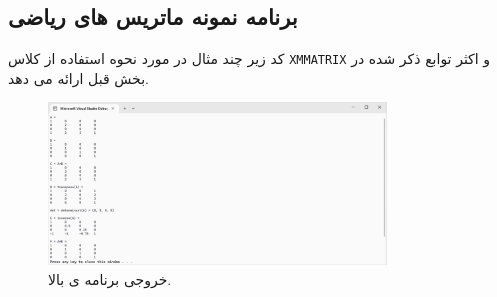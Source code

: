 \subsection{\textbf{برنامه نمونه ماتریس های ریاضی }}
{
    \Large
    \begin{spacing}{1.5}
        کد زیر چند مثال در مورد نحوه استفاده از کلاس \texttt{XMMATRIX} و اکثر توابع ذکر شده در بخش قبل ارائه می دهد.
        \textbf{\vspace{6pt}}
        \lr{}
        \textbf{\vspace{6pt}}

        \begin{figure}[H]
            \centering
            \setlength{\belowcaptionskip}{-10pt}
            \includegraphics[width=0.8\textwidth]{Images/4/2/4.Session.1.2.1}
            \caption {خروجی برنامه ی بالا.}
            \label{fig:4.Session.1.2.1}
        \end{figure}
    \end{spacing}
}
\newpage


